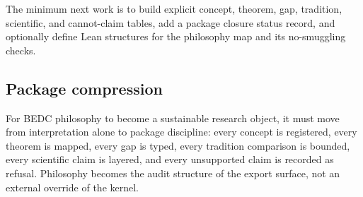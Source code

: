 \begin{corollary}
\label{cor:philosophy-package-minimum-next-work}
The minimum next work is to build explicit concept, theorem, gap,
tradition, scientific, and cannot-claim tables, add a package closure
status record, and optionally define Lean structures for the
philosophy map and its no-smuggling checks.
\end{corollary}

\subsection{Package compression}
\label{subsec:philosophy-package-compression}

\begin{definition}
\label{def:philosophy-package-compression}
For BEDC philosophy to become a sustainable research object, it must
move from interpretation alone to package discipline: every concept is
registered, every theorem is mapped, every gap is typed, every
tradition comparison is bounded, every scientific claim is layered,
and every unsupported claim is recorded as refusal. Philosophy becomes
the audit structure of the export surface, not an external override of
the kernel.
\end{definition}
